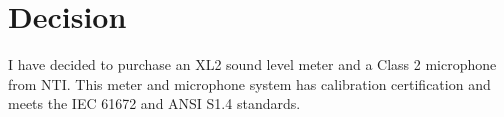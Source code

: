 \vspace{-0.5cm}
\section*{Decision}

\vspace{-0.5cm}
I have decided to purchase an XL2 sound level meter and a Class 2 microphone from NTI.  This meter and microphone system has calibration certification and meets the IEC 61672 and ANSI S1.4 standards.





%





\vspace{-0.5cm}


%
%
%
%
%
%
%
%
%
%
%







